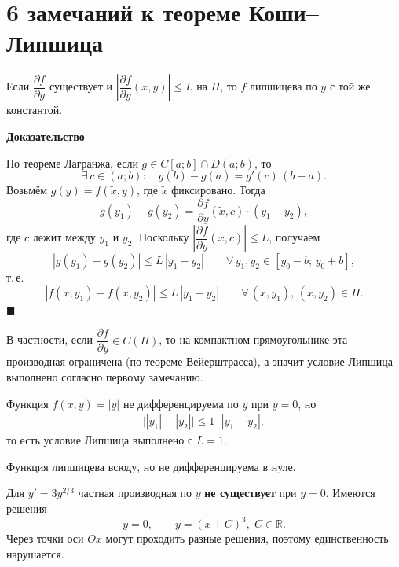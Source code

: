 \documentclass[12pt,a4paper]{article}
\numberwithin{equation}{section}
\renewenvironment{proof}[1][Доказательство]{\begin{center}\textbf{#1}\end{center}}{\hfill$\blacksquare$\par}
\begin{document}
\section{6 замечаний к теореме Коши–Липшица}

\begin{remarkHSE}
Если $\dfrac{\partial f}{\partial y}$ существует и \(\left|\dfrac{\partial f}{\partial y}(x,y)\right|\le L\) на $\Pi$, то \(f\) липшицева по \(y\) с той же константой.
\begin{proof}
По теореме Лагранжа, если $g\in C[a;b]\cap D(a;b)$, то
\[
  \exists\, c\in(a;b)\colon\quad g(b)-g(a)=g'(c)\,(b-a).
\]
Возьмём $g(y)=f(\tilde x,y)$, где $\tilde x$ фиксировано. Тогда
\[
  g(y_1)-g(y_2)=\frac{\partial f}{\partial y}(\tilde x,c)\cdot(y_1-y_2),
\]
где $c$ лежит между $y_1$ и $y_2$. Поскольку
\(\left|\dfrac{\partial f}{\partial y}(\tilde x,c)\right|\le L\), получаем
\[
  |g(y_1)-g(y_2)|\le L\,|y_1-y_2|\qquad\forall\, y_1,y_2\in[y_0-b;\,y_0+b],
\]
т.\,е.
\[
  |f(\tilde x,y_1)-f(\tilde x,y_2)|\le L\,|y_1-y_2|\qquad\forall\,(\tilde x,y_1),\,(\tilde x,y_2)\in\Pi.
\]
\end{proof}
\end{remarkHSE}

\begin{remarkHSE}
В частности, если $\dfrac{\partial f}{\partial y}\in C(\Pi)$, то на компактном прямоугольнике эта производная ограничена (по теореме Вейерштрасса), а значит условие Липшица выполнено согласно первому замечанию.
\end{remarkHSE}

\begin{exampleHSE}
Функция \(f(x,y)=|y|\) не дифференцируема по $y$ при $y=0$, но
\begin{gather*}
\bigl||y_1|-|y_2|\bigr|\le1\cdot|y_1-y_2|,
\end{gather*}
то есть условие Липшица выполнено с $L=1$.

Функция липшицева всюду, но не дифференцируема в нуле.
\end{exampleHSE}

\begin{exampleHSE}
Для \(y'=3y^{2/3}\) частная производная по $y$ \textbf{не существует} при $y=0$. Имеются решения
\[
y=0,
\qquad
y=\left(x+C\right)^3,\;C\in\mathbb{R}.
\]
Через точки оси $Ox$ могут проходить разные решения, поэтому единственность нарушается.
\end{exampleHSE}
\end{document}
